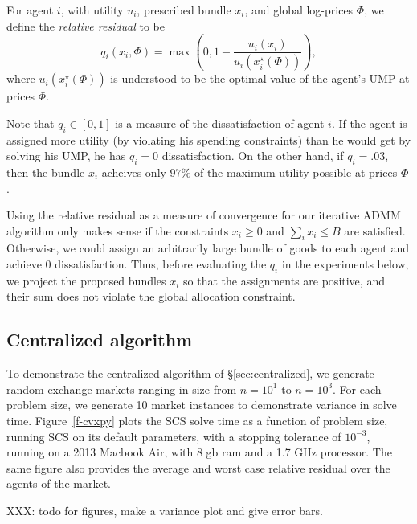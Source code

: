 \documentclass[12pt]{article}
\begin{document}
For agent $i$, with utility $u_i$, prescribed bundle $x_i$, and global log-prices $\Phi$,
we define the \emph{relative residual} to be
\[
q_i(x_i, \Phi)= \max\left(0,1-\frac{u_i(x_i)}{u_i(x_i^\star(\Phi))}\right),
\]
where $u_i(x_i^\star(\Phi))$ is understood to be the optimal value
of the agent's UMP at prices $\Phi$.

Note that $q_i \in [0,1]$ is a measure of the dissatisfaction of agent $i$. If
the agent is assigned more utility (by violating his spending constraints) than
he would get by solving his UMP, he has $q_i = 0$ dissatisfaction. On the other
hand, if $q_i = .03$, then the bundle $x_i$ acheives
only $97\%$ of the maximum utility possible at prices $\Phi$.

Using the relative residual as a measure of convergence for our iterative ADMM
algorithm only makes sense if the constraints $x_i \geq 0$ and $\sum_i x_i \leq
B$ are satisfied. Otherwise, we could assign an arbitrarily large bundle of
goods  to each agent and achieve $0$ dissatisfaction. Thus, before evaluating
the $q_i$ in the experiments below, we project the proposed bundles $x_i$ so
that the assignments are positive, and their sum does not violate the global
allocation constraint.

\subsection{Centralized algorithm}
\label{sec:centralized_examples}
To demonstrate the centralized algorithm of \S\ref{sec:centralized},
we generate random exchange markets ranging in size from $n=10^1$ to $n=10^3$.
For each problem size, we generate 10 market instances to demonstrate variance
in solve time. Figure~\ref{f-cvxpy} plots the SCS solve time as a function of
problem size, running SCS on its default parameters, with a stopping tolerance
of $10^{-3}$, running on a 2013 Macbook Air, with 8 gb ram and a 1.7 GHz
processor. The same figure also provides the average and worst case relative
residual over the agents of the market.

XXX: todo for figures, make a variance plot and give error bars.
\end{document}
